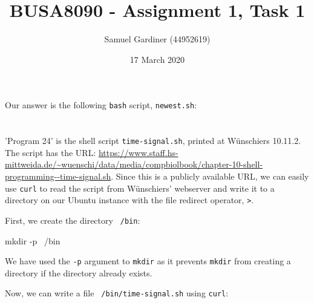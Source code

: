 \documentclass{article}
\title{BUSA8090 - Assignment 1, Task 1}
\author{Samuel Gardiner (44952619)}
\date{17 March 2020}
\begin{document}
\maketitle

\section{}

Our answer is the following \texttt{bash} script, \texttt{newest.sh}:

\begin{bashcode}

\end{bashcode}


\section{}

\section{}

\subsection{}
'Program 24' is the shell script \texttt{time-signal.sh}, printed at Wünschiers 10.11.2. The script has the URL:
\url{https://www.staff.hs-mittweida.de/~wuenschi/data/media/compbiolbook/chapter-10-shell-programming--time-signal.sh}. Since this is a publicly available URL, we can easily use \texttt{curl} to read the script from Wünschiers' webserver and write it to a directory on our Ubuntu instance with the file redirect operator, \texttt{>}.

First, we create the directory \texttt{~/bin}:
\begin{bashcode}
mkdir -p ~/bin
\end{bashcode}

We have used the \texttt{-p} argument to \texttt{mkdir} as it prevents \texttt{mkdir} from creating a directory if the directory already exists.

Now, we can write a file \texttt{~/bin/time-signal.sh} using \texttt{curl}:

\begin{verbatim}

\end{verbatim}
\end{document}
